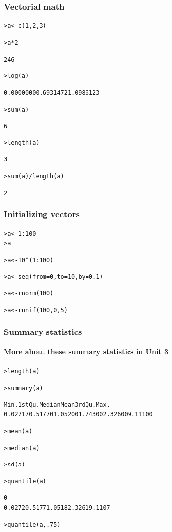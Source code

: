 \documentclass[t]{beamer} %
\begin{document}
\begin{frame}[fragile]
  \frametitle{Vectorial math}

\ungap[1]
\begin{alltt}
> a <- c(1,2,3) 

> a * 2   \begin{Rout}
[1] 2 4 6
\end{Rout}

> log(a)  \begin{Rout}
[1] 0.0000000 0.6931472 1.0986123
\end{Rout}
> sum(a)  \begin{Rout}
[1] 6
\end{Rout}
> length(a)\begin{Rout}
[1] 3
\end{Rout}
> sum(a)/length(a)\begin{Rout}
[1] 2
\end{Rout}
\end{alltt}

\end{frame}


\begin{frame}[fragile]
  \frametitle{Initializing vectors}

\begin{alltt}
> a <- 1:100            
> a

> a <- 10^(1:100)

> a <- seq(from=0, to=10, by=0.1) 

> a <- rnorm(100)       

> a <- runif(100, 0, 5) 
\end{alltt}
\end{frame}

\begin{frame}[fragile]
  \frametitle{Summary statistics}
  \framesubtitle{More about these summary statistics in Unit 3}

  \ungap[1]
\begin{alltt}
> length(a)

> summary(a)   \begin{Rout}
   Min. 1st Qu.  Median    Mean 3rd Qu.    Max. 
0.02717 0.51770 1.05200 1.74300 2.32600 9.11100  \end{Rout}

> mean(a)

> median(a)

> sd(a)       

> quantile(a) \begin{Rout}
    0%
0.0272 0.5177 1.0518 2.3261 9.1107 \end{Rout}

> quantile(a,.75)
\end{alltt}

\end{frame}
\end{document}
